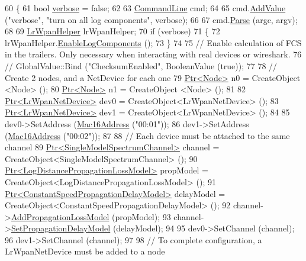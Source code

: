 \begin{DoxyCode}
60 \{
61   \textcolor{keywordtype}{bool} \hyperlink{openflow-switch_8cc_ab3f078684998b83967d507d0f453f454}{verbose} = \textcolor{keyword}{false};
62 
63   \hyperlink{classns3_1_1CommandLine}{CommandLine} cmd;
64 
65   cmd.\hyperlink{classns3_1_1CommandLine_addcfb546c7ad4c8bd0965654d55beb8e}{AddValue} (\textcolor{stringliteral}{"verbose"}, \textcolor{stringliteral}{"turn on all log components"}, verbose);
66 
67   cmd.\hyperlink{classns3_1_1CommandLine_a5c10b85b3207e5ecb48d907966923156}{Parse} (argc, argv);
68 
69   \hyperlink{classns3_1_1LrWpanHelper}{LrWpanHelper} lrWpanHelper;
70   \textcolor{keywordflow}{if} (verbose)
71     \{
72       lrWpanHelper.\hyperlink{classns3_1_1LrWpanHelper_a897bfee8ce0c3e4340545423cb3a69af}{EnableLogComponents} ();
73     \}
74 
75   \textcolor{comment}{// Enable calculation of FCS in the trailers. Only necessary when interacting with real devices or
       wireshark.}
76   \textcolor{comment}{// GlobalValue::Bind ("ChecksumEnabled", BooleanValue (true));}
77 
78   \textcolor{comment}{// Create 2 nodes, and a NetDevice for each one}
79   \hyperlink{classns3_1_1Ptr}{Ptr<Node>} n0 = CreateObject <Node> ();
80   \hyperlink{classns3_1_1Ptr}{Ptr<Node>} n1 = CreateObject <Node> ();
81 
82   \hyperlink{classns3_1_1Ptr}{Ptr<LrWpanNetDevice>} dev0 = CreateObject<LrWpanNetDevice> ();
83   \hyperlink{classns3_1_1Ptr}{Ptr<LrWpanNetDevice>} dev1 = CreateObject<LrWpanNetDevice> ();
84 
85   dev0->SetAddress (\hyperlink{classns3_1_1Mac16Address}{Mac16Address} (\textcolor{stringliteral}{"00:01"}));
86   dev1->SetAddress (\hyperlink{classns3_1_1Mac16Address}{Mac16Address} (\textcolor{stringliteral}{"00:02"}));
87 
88   \textcolor{comment}{// Each device must be attached to the same channel}
89   \hyperlink{classns3_1_1Ptr}{Ptr<SingleModelSpectrumChannel>} channel = 
      CreateObject<SingleModelSpectrumChannel> ();
90   \hyperlink{classns3_1_1Ptr}{Ptr<LogDistancePropagationLossModel>} propModel = 
      CreateObject<LogDistancePropagationLossModel> ();
91   \hyperlink{classns3_1_1Ptr}{Ptr<ConstantSpeedPropagationDelayModel>} delayModel = 
      CreateObject<ConstantSpeedPropagationDelayModel> ();
92   channel->\hyperlink{classns3_1_1SingleModelSpectrumChannel_a3d8c68e54e0e7659fdf715260d5613ac}{AddPropagationLossModel} (propModel);
93   channel->\hyperlink{classns3_1_1SingleModelSpectrumChannel_afd757c085623596ebf3da8264cfbaa45}{SetPropagationDelayModel} (delayModel);
94 
95   dev0->SetChannel (channel);
96   dev1->SetChannel (channel);
97 
98   \textcolor{comment}{// To complete configuration, a LrWpanNetDevice must be added to a node}

\end{DoxyCode}
